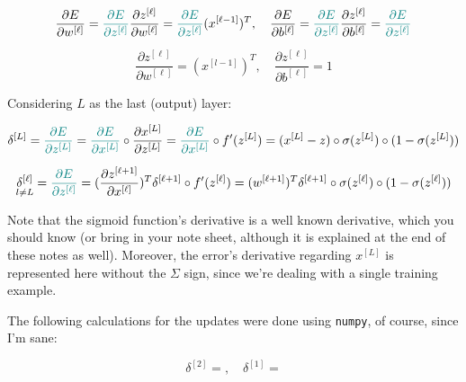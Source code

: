 \documentclass[12pt]{article}
\begin{document}
\begin{enumerate}[leftmargin=\labelsep]
  \begin{equation*}
    \frac{\partial E}{\partial w^{[\ell]}} = \textcolor{teal}{\frac{\partial E}{\partial z^{[\ell]}}} \frac{\partial z^{[\ell]}}{\partial w^{[\ell]}} = \textcolor{teal}{\frac{\partial E}{\partial z^{[\ell]}}} (x^{[\ell-1]})^T, \quad
    \frac{\partial E}{\partial b^{[\ell]}} = \textcolor{teal}{\frac{\partial E}{\partial z^{[\ell]}}} \frac{\partial z^{[\ell]}}{\partial b^{[\ell]}} = \textcolor{teal}{\frac{\partial E}{\partial z^{[\ell]}}}
  \end{equation*}

  \begin{equation*}
    \frac{\partial z^{[\ell]}}{\partial w^{[\ell]}} = (x^{[l-1]})^T, \quad
    \frac{\partial z^{[\ell]}}{\partial b^{[\ell]}} = 1
  \end{equation*}

  Considering $L$ as the last (output) layer:

  \begin{equation*}
    \delta^{[L]} = \textcolor{teal}{\frac{\partial E}{\partial z^{[L]}}}
    = \textcolor{teal}{\frac{\partial E}{\partial x^{[L]}}} \circ \frac{\partial x^{[L]}}{\partial z^{[L]}}
    = \textcolor{teal}{\frac{\partial E}{\partial x^{[L]}}} \circ f'(z^{[L]})
    = (x^{[L]} - z) \circ \sigma(z^{[L]}) \circ (1 - \sigma(z^{[L]}))
  \end{equation*}

  \begin{equation*}
    \underset{l \neq L}{\delta^{[\ell]}} = \textcolor{teal}{\frac{\partial E}{\partial z^{[\ell]}}}
    = (\frac{\partial z^{[\ell+1]}}{\partial x^{[\ell]}})^T \delta^{[\ell+1]} \circ f'(z^{[\ell]})
    = (w^{[\ell+1]})^T \delta^{[\ell+1]} \circ \sigma(z^{[\ell]}) \circ (1 - \sigma(z^{[\ell]}))
  \end{equation*}

  Note that the sigmoid function's derivative is a well known derivative,
  which you should know (or bring in your note sheet, although it is explained
  at the end of these notes as well). Moreover, the error's
  derivative regarding $x^{[L]}$ is represented here without the $\Sigma$ sign,
  since we're dealing with a single training example.

  The following calculations for the updates were done using \texttt{numpy}, of course, since I'm sane:

  \begin{equation*}
    \delta^{[2]} = , \quad \delta^{[1]} = 
  \end{equation*}


\end{enumerate}
\end{document}
